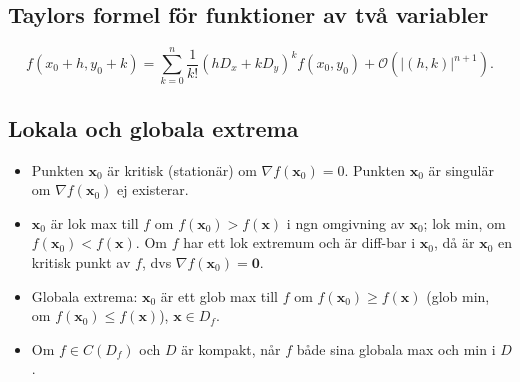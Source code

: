 \documentclass{article}
\newcommand\Ordo{\mathcal O}
\newcommand\bdx{\mathbf x}
\newcommand\bdzero{\mathbf 0}
\begin{document}
\subsection*{
   {Taylors formel för funktioner av två variabler}
}

\[
f(x_0+h,y_0+k)
= \sum_{k=0}^n \frac1{k!}(hD_x+kD_y)^kf(x_0,y_0) + \Ordo(|(h,k)|^{n+1}).
\]

\subsection*{
   {Lokala och globala extrema}
}

\begin{itemize}

\item %
     {Punkten}
$\bdx_0$ 
   {är kritisk (stationär) om}
$\nabla f(\bdx_0)=0$.
     {Punkten}
$\bdx_0$
   {är singulär om}
$\nabla f(\bdx_0)$
   {ej existerar.}


\item {} %
  $\bdx_0$
     {är lok max till}
  $f$
     {om}
  $f(\bdx_0)>f(\bdx)$
     {i ngn omgivning av}
  $\bdx_0$;
     {lok min, om}
  $f(\bdx_0)<f(\bdx)$.
     {Om}
  $f$
     {har ett lok extremum och är diff-bar i}
  $\bdx_0$,
     {då är}
  $\bdx_0$
     {en kritisk punkt av}
  $f$,
     {dvs}
  $\nabla f(\bdx_0)=\bdzero$.

  \item %
       {Globala extrema}:
  $\bdx_0$
     {är ett glob max till}
  $f$
     {om}
  $f(\bdx_0)\ge f(\bdx)$
  (glob min,
     {om}
  $f(\bdx_0)\le f(\bdx)$),
  $\bdx\in D_f$.%

\item %
     {Om}
 $f\in  C(D_f)$
    {och}
 $D$
    {är kompakt, når}
 $f$
    {både sina globala max och min i}
 $D$.%

\end{itemize}
\end{document}
